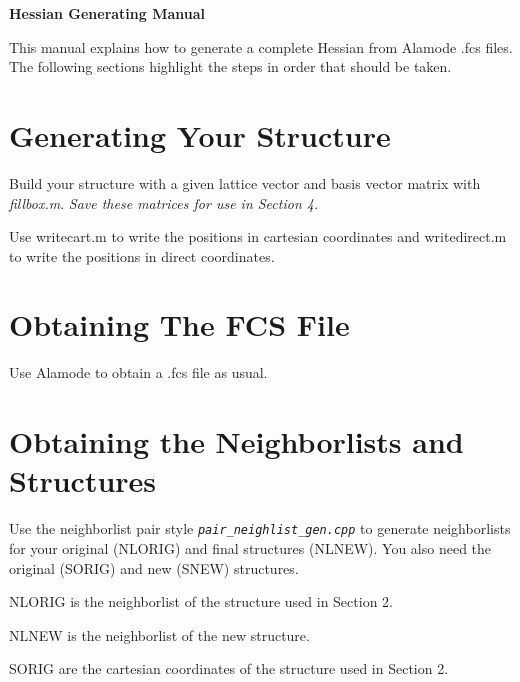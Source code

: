\documentclass[20pt]{article}
\begin{document}
\begin{center}
{\large \bf Hessian Generating Manual } \\   %
\end{center}

This manual explains how to generate a complete Hessian from Alamode .fcs files. The following sections highlight the steps in order that should be taken.



\section{Generating Your Structure}

Build your structure with a given lattice vector and basis vector matrix with \emph{fillbox.m}. \emph{Save these matrices for use in Section 4.}

Use writecart.m to write the positions in cartesian coordinates and writedirect.m to write the positions in direct coordinates.




\section{Obtaining The FCS File}

Use Alamode to obtain a .fcs file as usual.


\section{Obtaining the Neighborlists and Structures}

Use the neighborlist pair style \texttt{\emph{pair\_neighlist\_gen.cpp}} to generate neighborlists for your original (NLORIG) and final structures (NLNEW). You also need the original (SORIG) and new (SNEW) structures. 

NLORIG is the neighborlist of the structure used in Section 2. 

NLNEW is the neighborlist of the new structure. 

SORIG are the cartesian coordinates of the structure used in Section 2. 
\end{document}
